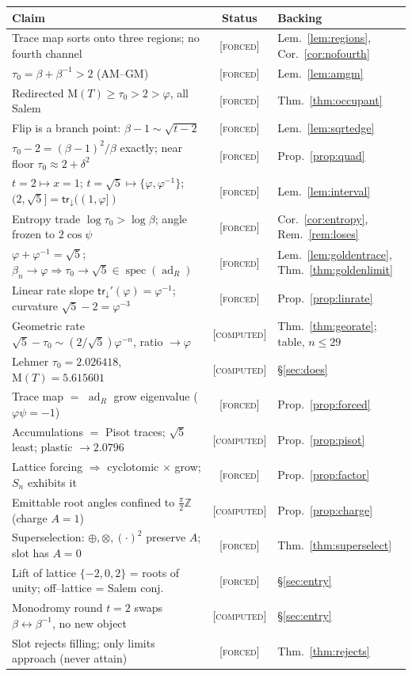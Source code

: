 \documentclass[11pt]{article}
\theoremstyle{plain}
\theoremstyle{definition}
\theoremstyle{remark}
\newcommand{\forced}{\textcolor{forcedc}{\textsc{[forced]}}}
\newcommand{\computed}{\textcolor{forcedc}{\textsc{[computed]}}}
\newcommand{\Z}{\mathbb{Z}}
\newcommand{\Mah}{\mathrm{M}}
\newcommand{\spec}{\operatorname{spec}}
\newcommand{\ad}{\operatorname{ad}}
\newcommand{\trace}{\mathsf{tr}_{\!\downarrow}}
\begin{document}
\begin{center}
\renewcommand{\arraystretch}{1.16}
\begin{tabular}{@{}p{8.0cm}cl@{}}
\toprule
\textbf{Claim} & \textbf{Status} & \textbf{Backing} \\
\midrule
Trace map sorts onto three regions; no fourth channel & \forced & Lem.~\ref{lem:regions}, Cor.~\ref{cor:nofourth}\\
$\tau_0=\beta+\beta^{-1}>2$ (AM--GM) & \forced & Lem.~\ref{lem:amgm}\\
Redirected $\Mah(T)\ge\tau_0>2>\varphi$, all Salem & \forced & Thm.~\ref{thm:occupant}\\
Flip is a branch point: $\beta-1\sim\sqrt{t-2}$ & \forced & Lem.~\ref{lem:sqrtedge}\\
$\tau_0-2=(\beta-1)^2/\beta$ exactly; near floor $\tau_0\approx2+\delta^2$ & \forced & Prop.~\ref{prop:quad}\\
$t{=}2\mapsto x{=}1$; $t{=}\sqrt5\mapsto\{\varphi,\varphi^{-1}\}$; $(2,\sqrt5]=\trace((1,\varphi])$ & \forced & Lem.~\ref{lem:interval}\\
Entropy trade $\log\tau_0>\log\beta$; angle frozen to $2\cos\psi$ & \forced & Cor.~\ref{cor:entropy}, Rem.~\ref{rem:loses}\\
$\varphi+\varphi^{-1}=\sqrt5$; $\beta_n\!\to\!\varphi\Rightarrow\tau_0\!\to\!\sqrt5\in\spec(\ad_R)$ & \forced & Lem.~\ref{lem:goldentrace}, Thm.~\ref{thm:goldenlimit}\\
Linear rate slope $\trace'(\varphi)=\varphi^{-1}$; curvature $\sqrt5-2=\varphi^{-3}$ & \forced & Prop.~\ref{prop:linrate}\\
Geometric rate $\sqrt5-\tau_0\sim(2/\sqrt5)\varphi^{-n}$, ratio $\to\varphi$ & \computed & Thm.~\ref{thm:georate}; table, $n\le29$\\
Lehmer $\tau_0{=}2.026418$, $\Mah(T){=}5.615601$ & \computed & \S\ref{sec:does}\\
Trace map $=$ $\ad_R$ grow eigenvalue ($\varphi\psi{=}-1$) & \forced & Prop.~\ref{prop:forced}\\
Accumulations $=$ Pisot traces; $\sqrt5$ least; plastic $\to2.0796$ & \computed & Prop.~\ref{prop:pisot}\\
Lattice forcing $\Rightarrow$ cyclotomic $\times$ grow; $S_n$ exhibits it & \forced & Prop.~\ref{prop:factor}\\
Emittable root angles confined to $\tfrac\pi2\Z$ (charge $A{=}1$) & \computed & Prop.~\ref{prop:charge}\\
Superselection: $\oplus,\otimes,(\cdot)^2$ preserve $A$; slot has $A{=}0$ & \forced & Thm.~\ref{thm:superselect}\\
Lift of lattice $\{-2,0,2\}$ = roots of unity; off--lattice = Salem conj. & \forced & \S\ref{sec:entry}\\
Monodromy round $t{=}2$ swaps $\beta\leftrightarrow\beta^{-1}$, no new object & \computed & \S\ref{sec:entry}\\
Slot rejects filling; only limits approach (never attain) & \forced & Thm.~\ref{thm:rejects}\\
\bottomrule
\end{tabular}
\end{center}
\end{document}
